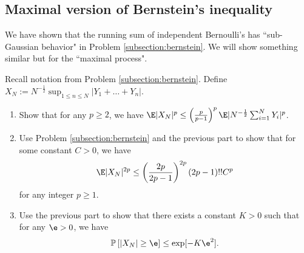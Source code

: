 \documentclass[12pt,reqno]{amsart}
\theoremstyle{definition}
\theoremstyle{remark}
\numberwithin{equation}{section}
\begin{document}
\subsection{Maximal version of Bernstein's inequality}
We have shown that the running sum of independent Bernoulli's has ``sub-Gaussian behavior" in Problem \ref{subsection:bernstein}. We will show something similar but for the ``maximal process".

Recall notation from Problem \ref{subsection:bernstein}. Define $X_{N}:=N^{-\frac12}\sup_{1\leq n\leq N}|Y_{1}+\ldots+Y_{n}|$.
\begin{enumerate}
\item Show that for any $p\geq2$, we have $\E|X_{N}|^{p}\leq\left(\frac{p}{p-1}\right)^{p}\E|N^{-\frac12}\sum_{i=1}^{N}Y_{i}|^{p}$.
\item Use Problem \ref{subsection:bernstein} and the previous part to show that for some constant $C>0$, we have 
%
\begin{align*}
\E|X_{N}|^{2p}\leq\left(\frac{2p}{2p-1}\right)^{2p}(2p-1)!!C^{p}
\end{align*}
%
for any integer $p\geq1$.
\item Use the previous part to show that there exists a constant $K>0$ such that for any $\e>0$, we have
%
\begin{align*}
\mathbb{P}\left[|X_{N}|\geq \e\right]\leq\exp[-K\e^{2}].
\end{align*}
%
\end{enumerate}
\end{document}
